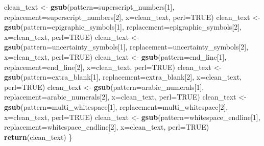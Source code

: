 \documentclass[]{article}
\newenvironment{Shaded}{\begin{snugshade}}{\end{snugshade}}
\newcommand{\DataTypeTok}[1]{\textcolor[rgb]{0.13,0.29,0.53}{#1}}
\newcommand{\DecValTok}[1]{\textcolor[rgb]{0.00,0.00,0.81}{#1}}
\newcommand{\KeywordTok}[1]{\textcolor[rgb]{0.13,0.29,0.53}{\textbf{#1}}}
\newcommand{\NormalTok}[1]{#1}
\newcommand{\OtherTok}[1]{\textcolor[rgb]{0.56,0.35,0.01}{#1}}
\newcommand{\StringTok}[1]{\textcolor[rgb]{0.31,0.60,0.02}{#1}}
\begin{document}
\begin{Shaded}
\begin{Highlighting}[]
\NormalTok{  clean_text <-}\StringTok{ }\KeywordTok{gsub}\NormalTok{(}\DataTypeTok{pattern=}\NormalTok{superscript_numbers[}\DecValTok{1}\NormalTok{], }\DataTypeTok{replacement=}\NormalTok{superscript_numbers[}\DecValTok{2}\NormalTok{], }\DataTypeTok{x=}\NormalTok{clean_text, }\DataTypeTok{perl=}\OtherTok{TRUE}\NormalTok{)}
\NormalTok{  clean_text <-}\StringTok{ }\KeywordTok{gsub}\NormalTok{(}\DataTypeTok{pattern=}\NormalTok{epigraphic_symbols[}\DecValTok{1}\NormalTok{], }\DataTypeTok{replacement=}\NormalTok{epigraphic_symbols[}\DecValTok{2}\NormalTok{], }\DataTypeTok{x=}\NormalTok{clean_text, }\DataTypeTok{perl=}\OtherTok{TRUE}\NormalTok{)}
\NormalTok{  clean_text <-}\StringTok{ }\KeywordTok{gsub}\NormalTok{(}\DataTypeTok{pattern=}\NormalTok{uncertainty_symbols[}\DecValTok{1}\NormalTok{], }\DataTypeTok{replacement=}\NormalTok{uncertainty_symbols[}\DecValTok{2}\NormalTok{], }\DataTypeTok{x=}\NormalTok{clean_text, }\DataTypeTok{perl=}\OtherTok{TRUE}\NormalTok{)}
\NormalTok{  clean_text <-}\StringTok{ }\KeywordTok{gsub}\NormalTok{(}\DataTypeTok{pattern=}\NormalTok{end_line[}\DecValTok{1}\NormalTok{], }\DataTypeTok{replacement=}\NormalTok{end_line[}\DecValTok{2}\NormalTok{], }\DataTypeTok{x=}\NormalTok{clean_text, }\DataTypeTok{perl=}\OtherTok{TRUE}\NormalTok{)}
\NormalTok{  clean_text <-}\StringTok{ }\KeywordTok{gsub}\NormalTok{(}\DataTypeTok{pattern=}\NormalTok{extra_blank[}\DecValTok{1}\NormalTok{], }\DataTypeTok{replacement=}\NormalTok{extra_blank[}\DecValTok{2}\NormalTok{], }\DataTypeTok{x=}\NormalTok{clean_text, }\DataTypeTok{perl=}\OtherTok{TRUE}\NormalTok{)}
\NormalTok{  clean_text <-}\StringTok{ }\KeywordTok{gsub}\NormalTok{(}\DataTypeTok{pattern=}\NormalTok{arabic_numerals[}\DecValTok{1}\NormalTok{], }\DataTypeTok{replacement=}\NormalTok{arabic_numerals[}\DecValTok{2}\NormalTok{], }\DataTypeTok{x=}\NormalTok{clean_text, }\DataTypeTok{perl=}\OtherTok{TRUE}\NormalTok{)}
\NormalTok{  clean_text <-}\StringTok{ }\KeywordTok{gsub}\NormalTok{(}\DataTypeTok{pattern=}\NormalTok{multi_whitespace[}\DecValTok{1}\NormalTok{], }\DataTypeTok{replacement=}\NormalTok{multi_whitespace[}\DecValTok{2}\NormalTok{], }\DataTypeTok{x=}\NormalTok{clean_text, }\DataTypeTok{perl=}\OtherTok{TRUE}\NormalTok{)}
\NormalTok{  clean_text <-}\StringTok{ }\KeywordTok{gsub}\NormalTok{(}\DataTypeTok{pattern=}\NormalTok{whitespace_endline[}\DecValTok{1}\NormalTok{], }\DataTypeTok{replacement=}\NormalTok{whitespace_endline[}\DecValTok{2}\NormalTok{], }\DataTypeTok{x=}\NormalTok{clean_text, }\DataTypeTok{perl=}\OtherTok{TRUE}\NormalTok{)}
      \KeywordTok{return}\NormalTok{(clean_text)}
\NormalTok{\}}
\end{Highlighting}
\end{Shaded}
\end{document}
